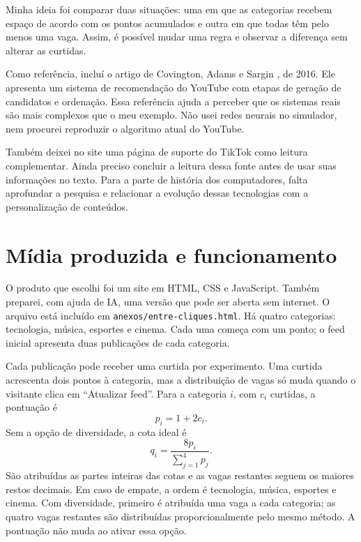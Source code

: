 \documentclass[12pt,a4paper]{article}
\begin{document}
Minha ideia foi comparar duas situações: uma em que as categorias recebem espaço de acordo com os pontos acumulados e outra em que todas têm pelo menos uma vaga. Assim, é possível mudar uma regra e observar a diferença sem alterar as curtidas.

Como referência, incluí o artigo de Covington, Adams e Sargin \cite{covington}, de 2016. Ele apresenta um sistema de recomendação do YouTube com etapas de geração de candidatos e ordenação. Essa referência ajuda a perceber que os sistemas reais são mais complexos que o meu exemplo. Não usei redes neurais no simulador, nem procurei reproduzir o algoritmo atual do YouTube.

Também deixei no site uma página de suporte do TikTok como leitura complementar. Ainda preciso concluir a leitura dessa fonte antes de usar suas informações no texto. Para a parte de história dos computadores, falta aprofundar a pesquisa e relacionar a evolução dessas tecnologias com a personalização de conteúdos.

\section{Mídia produzida e funcionamento}\label{sec:modelo}
O produto que escolhi foi um site em HTML, CSS e JavaScript. Também preparei, com ajuda de IA, uma versão que pode ser aberta sem internet. O arquivo está incluído em \texttt{anexos/entre-cliques.html}. Há quatro categorias: tecnologia, música, esportes e cinema. Cada uma começa com um ponto; o feed inicial apresenta duas publicações de cada categoria.

Cada publicação pode receber uma curtida por experimento. Uma curtida acrescenta dois pontos à categoria, mas a distribuição de vagas só muda quando o visitante clica em ``Atualizar feed''. Para a categoria $i$, com $c_i$ curtidas, a pontuação é
\begin{equation}\label{eq:pontos}p_i=1+2c_i.\end{equation}
Sem a opção de diversidade, a cota ideal é
\begin{equation}\label{eq:cotas}q_i=\frac{8p_i}{\sum_{j=1}^{4}p_j}.\end{equation}
São atribuídas as partes inteiras das cotas e as vagas restantes seguem os maiores restos decimais. Em caso de empate, a ordem é tecnologia, música, esportes e cinema. Com diversidade, primeiro é atribuída uma vaga a cada categoria; as quatro vagas restantes são distribuídas proporcionalmente pelo mesmo método. A pontuação não muda ao ativar essa opção.
\end{document}
